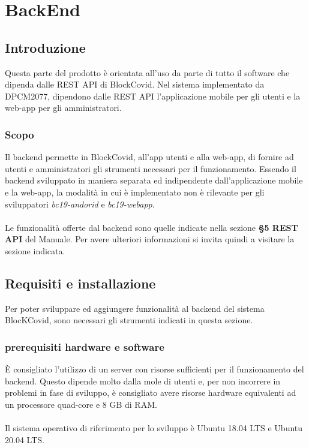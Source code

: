 \section{BackEnd}
\subsection{Introduzione}
Questa parte del prodotto è orientata all'uso da parte di tutto il software che dipenda dalle REST API di BlockCovid. Nel sistema implementato da DPCM2077, dipendono dalle REST API l'applicazione mobile per gli utenti e la web-app per gli amministratori.

\subsubsection{Scopo}
Il backend permette in BlockCovid, all'app utenti e alla web-app, di fornire ad utenti e amministratori gli strumenti necessari per il funzionamento. Essendo il backend sviluppato in maniera separata ed indipendente dall'applicazione mobile e la web-app, la modalità in cui è implementato non è rilevante per gli sviluppatori \textit{bc19-andorid} e \textit{bc19-webapp}.
\\
\\
Le funzionalità offerte dal backend sono quelle indicate nella sezione \textbf{§5 REST API} del Manuale. Per avere ulteriori informazioni si invita quindi a visitare la sezione indicata.


\subsection{Requisiti e installazione}
Per poter sviluppare ed aggiungere funzionalità al backend del sistema BlocKCovid, sono necessari gli strumenti indicati in questa sezione.

\subsubsection{prerequisiti hardware e software}
È consigliato l'utilizzo di un server con risorse sufficienti per il funzionamento del backend. Questo dipende molto dalla mole di utenti e, per non incorrere in problemi in fase di sviluppo, è consigliato avere risorse hardware equivalenti ad un processore quad-core e 8 GB di RAM.
\\\\
Il sistema operativo di riferimento per lo sviluppo è Ubuntu 18.04 LTS e Ubuntu 20.04 LTS.

